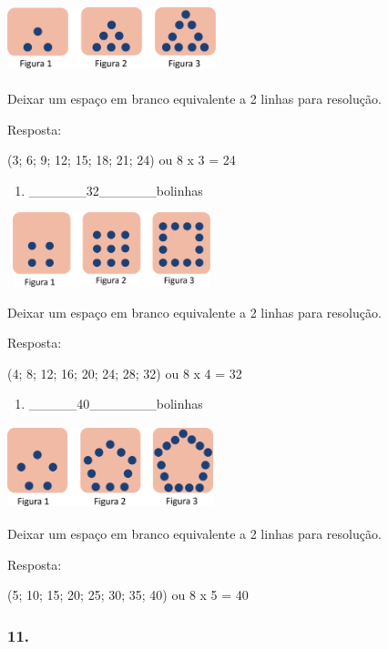 \includegraphics[width=2.38354in,height=0.81674in]{media/image33.png}

Deixar um espaço em branco equivalente a 2 linhas para resolução.

Resposta:

(3; 6; 9; 12; 15; 18; 21; 24) ou 8 x 3 = 24

\begin{enumerate}
\def\labelenumi{\alph{enumi})}
\item
  \_\_\_\_\_\_32\_\_\_\_\_\_bolinhas
\end{enumerate}

\includegraphics[width=2.38354in,height=0.85007in]{media/image34.png}

Deixar um espaço em branco equivalente a 2 linhas para resolução.

Resposta:

(4; 8; 12; 16; 20; 24; 28; 32) ou 8 x 4 = 32

\begin{enumerate}
\def\labelenumi{\alph{enumi})}
\item
  \_\_\_\_\_40\_\_\_\_\_\_\_bolinhas
\end{enumerate}

\includegraphics[width=2.35854in,height=0.94175in]{media/image35.png}

Deixar um espaço em branco equivalente a 2 linhas para resolução.

Resposta:

(5; 10; 15; 20; 25; 30; 35; 40) ou 8 x 5 = 40

\subsubsection{11.}\label{section-43}


